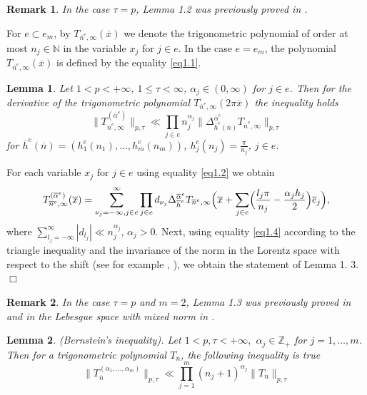 \documentclass[12pt]{article}
\theoremstyle{plain}
\newtheorem{rem}{Remark}[section]
\newtheorem{lemma}{Lemma}[section]
\begin{document}
\begin{rem}\label{rem1.1}
In the case $\tau = p$, Lemma 1.2 was previously proved in \cite[Theorem 5. 1]{17}.
\end{rem}
For $e\subset e_{m}$, by $T_{\overline{n}^{e}, \infty}(\overline{x})$ we denote the trigonometric polynomial of order at most $n_{j}\in \mathbb{N}$ in the variable $x_{j}$ for $j\in e$. In the case $e=e_{m}$, the polynomial $T_{\overline{n}^{e}, \infty}(\overline{x})$ is defined by the equality \eqref{eq1.1}.
\begin{lemma}\label{lem1 3}
Let 
 $1 < p < +\infty$, $1\leqslant \tau<\infty$,
$\alpha_{j}\in (0, \infty)$ for
 $j\in e$. 
 Then for the derivative 
of the trigonometric polynomial $T_{\overline{n}^{e}, \infty}(2\pi\overline{x})$ 
the inequality holds
  \begin{equation*}
 \|T_{\overline{n}^{e}, \infty}^{(\overline{\alpha}^{e})}\|_{p, \tau}\ll \prod_{j\in e}n_{j}^{\alpha_{j}}\|\Delta_{\overline{h}^{e}(\overline{n})}^{\overline{\alpha}^{e}}T_{\overline{n}^{e}, \infty}\|_{p, \tau} 
\end{equation*}
for 
 $\overline{h}^{e}(\overline{n})=(h_{1}^{e}(n_{1}),\ldots , h_{m}^{e}(n_{m}))$, $h_{j}^{e}(n_{j})=\frac{\pi}{n_{j}}$,  $j\in e$.
\end{lemma}
\proof
For each variable $x_{j}$ for $j\in e$ using equality \eqref{eq1.2} we obtain
   \begin{equation}\label{eq1.4}
T_{\overline{n}^{e}, \infty}^{(\overline{\alpha}^{e})}(\overline{x})=\sum_{\nu_{j}=-\infty, j\in e}^{\infty}\prod_{j\in e}d_{\nu_{j}}\Delta_{\overline{h}^{e}}^{\overline{\alpha}^{e}}T_{\overline{n}^{e}, \infty}\Bigl(\overline{x}+\sum_{j\in e}\Bigl(\frac{l_{j}\pi}{n_{j}}-\frac{\alpha_{j}h_{j}}{2}\Bigr)\overline{e}_{j}\Bigr),
\end{equation}
where 
 $\sum_{l_{j}=-\infty}^{\infty}|d_{l_{j}}|\ll n_{j}^{\alpha_{j}}$, $\alpha_{j} > 0$.
Next, using equality \eqref{eq1.4} according to the triangle inequality and the invariance of the norm in the Lorentz space with respect to the shift (see for example \cite{7}, \cite{12}), we obtain the statement of Lemma 1. 3. 
  \hfill $\Box$
 
\begin{rem}\label{rem1.2}
In the case $\tau = p$ and $m=2$, Lemma 1.3 was previously proved in \cite{17} and in the Lebesgue space with mixed norm in \cite{18}.
 \end{rem}

\begin{lemma}\label{lem1 4}
(Bernstein's inequality). %
Let $1 <p, \tau < +\infty,$ $\alpha_{j}\in \mathbb{Z}_{+}$ for $j=1, \ldots , m$. Then for a trigonometric polynomial $T_{\overline{n}}$, the following inequality is true
\begin{equation*}
\|T_{\overline{n}}^{(\alpha_{1},...,\alpha_{m})}\|_{p, \tau}\ll\prod_{j=1}^{m}(n_{j}+1)^{\alpha_{j}} \|T_{\overline{n}}\|_{p, \tau}
\end{equation*}
\end{lemma}
 
\end{document}
